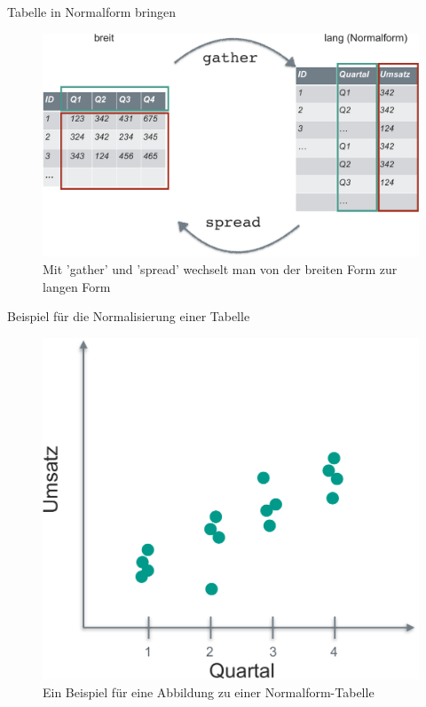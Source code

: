 \begin{frame}{Tabelle in Normalform bringen}

\begin{figure}

{\centering \includegraphics[width=0.8\linewidth]{../images/tidy/gather_spread-crop} 

}

\caption{Mit 'gather' und 'spread' wechselt man von der breiten Form zur langen Form}\label{fig:gather-spread}
\end{figure}

\end{frame}

\begin{frame}{Beispiel für die Normalisierung einer Tabelle}

\begin{figure}

{\centering \includegraphics[width=0.5\linewidth]{../images/tidy/bsp_diagramm-crop} 

}

\caption{Ein Beispiel für eine Abbildung zu einer Normalform-Tabelle}\label{fig:bsp-abb}
\end{figure}

\end{frame}

